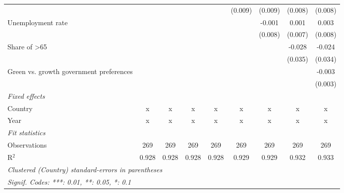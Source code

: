 \begin{table}[htbp]
\begin{tabular}{lcccccccc}
                                                         &              &              &              &              & (0.009)      & (0.009)     & (0.008) & (0.008)\\   
      Unemployment rate                                  &              &              &              &              &              & -0.001      & 0.001   & 0.003\\   
                                                         &              &              &              &              &              & (0.008)     & (0.007) & (0.008)\\   
      Share of >65                                       &              &              &              &              &              &             & -0.028  & -0.024\\   
                                                         &              &              &              &              &              &             & (0.035) & (0.034)\\   
      Green vs. growth government preferences            &              &              &              &              &              &             &         & -0.003\\   
                                                         &              &              &              &              &              &             &         & (0.003)\\   
      \emph{Fixed effects}\\
      Country                                            & x            & x            & x            & x            & x            & x           & x       & x\\  
      Year                                               & x            & x            & x            & x            & x            & x           & x       & x\\  
      \midrule \emph{Fit statistics}\\
      Observations                                       & 269          & 269          & 269          & 269          & 269          & 269         & 269     & 269\\  
      R$^2$                                              & 0.928        & 0.928        & 0.928        & 0.928        & 0.929        & 0.929       & 0.932   & 0.933\\  
      \midrule
      \multicolumn{9}{l}{\emph{Clustered (Country) standard-errors in parentheses}}\\
      \multicolumn{9}{l}{\emph{Signif. Codes: ***: 0.01, **: 0.05, *: 0.1}}\\
   \end{tabular}
\end{table}


